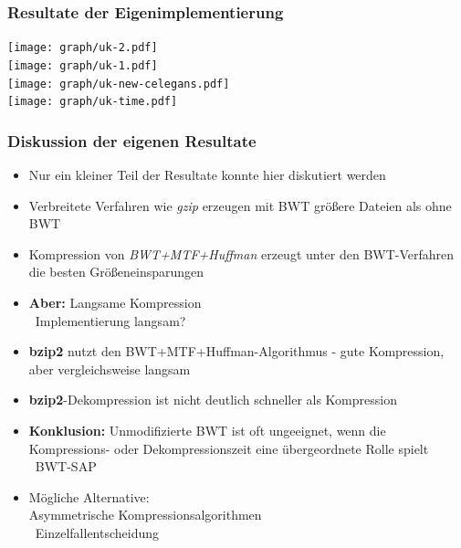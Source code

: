 \documentclass[14pt,xcolor=dvipsnames,pdftex]{beamer}
\begin{document}
\begin{frame}[allowframebreaks]
 \frametitle{Resultate der Eigenimplementierung}
 \texttt{[image: graph/uk-2.pdf]}
 \framebreak\\
 \texttt{[image: graph/uk-1.pdf]}
 \framebreak\\
 \texttt{[image: graph/uk-new-celegans.pdf]}
 \framebreak\\
 \texttt{[image: graph/uk-time.pdf]}
\end{frame}
\begin{frame}[allowframebreaks]
 \frametitle{Diskussion der eigenen Resultate}
 \begin{itemize}
  \item Nur ein kleiner Teil der Resultate konnte hier diskutiert werden
  \item Verbreitete Verfahren wie \textit{gzip} erzeugen mit BWT größere Dateien als ohne BWT
  \item Kompression von \textit{BWT+MTF+Huffman} erzeugt unter den BWT-Verfahren die besten Größeneinsparungen\\
  \item \textbf{Aber:} Langsame Kompression\\
  \textrightarrow\ Implementierung langsam?
 \end{itemize}
 \framebreak
 \begin{itemize}
  \item \textbf{bzip2} nutzt den BWT+MTF+Huffman-Algorithmus - gute Kompression, aber vergleichsweise langsam
  \item \textbf{bzip2}-Dekompression ist nicht deutlich schneller als Kompression
  \end{itemize}
  \framebreak
  \begin{itemize}
  \item \textbf{Konklusion:} Unmodifizierte BWT ist oft ungeeignet, wenn die Kompressions- oder Dekompressionszeit eine übergeordnete Rolle spielt\\
  \textrightarrow\ BWT-SAP
  \item Mögliche Alternative:\\
  Asymmetrische Kompressionsalgorithmen\\
  \textrightarrow\ Einzelfallentscheidung
 \end{itemize}
\end{frame}
\end{document}
